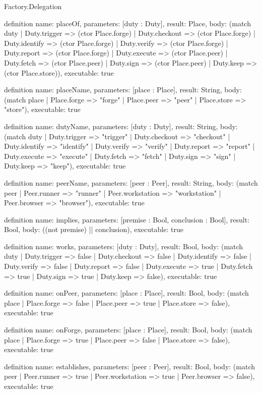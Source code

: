 \begin{lexlean}{Factory.Delegation}
\begin{semanticmodule}
definition{
  name: placeOf,
  parameters: [duty : Duty],
  result: Place,
  body: (match duty
    | Duty.trigger => (ctor Place.forge)
    | Duty.checkout => (ctor Place.forge)
    | Duty.identify => (ctor Place.forge)
    | Duty.verify => (ctor Place.forge)
    | Duty.report => (ctor Place.forge)
    | Duty.execute => (ctor Place.peer)
    | Duty.fetch => (ctor Place.peer)
    | Duty.sign => (ctor Place.peer)
    | Duty.keep => (ctor Place.store)),
  executable: true
}

definition{
  name: placeName,
  parameters: [place : Place],
  result: String,
  body: (match place
    | Place.forge => "forge"
    | Place.peer => "peer"
    | Place.store => "store"),
  executable: true
}

definition{
  name: dutyName,
  parameters: [duty : Duty],
  result: String,
  body: (match duty
    | Duty.trigger => "trigger"
    | Duty.checkout => "checkout"
    | Duty.identify => "identify"
    | Duty.verify => "verify"
    | Duty.report => "report"
    | Duty.execute => "execute"
    | Duty.fetch => "fetch"
    | Duty.sign => "sign"
    | Duty.keep => "keep"),
  executable: true
}

definition{
  name: peerName,
  parameters: [peer : Peer],
  result: String,
  body: (match peer
    | Peer.runner => "runner"
    | Peer.workstation => "workstation"
    | Peer.browser => "browser"),
  executable: true
}

definition{
  name: implies,
  parameters: [premise : Bool, conclusion : Bool],
  result: Bool,
  body: ((not premise) || conclusion),
  executable: true
}

definition{
  name: works,
  parameters: [duty : Duty],
  result: Bool,
  body: (match duty
    | Duty.trigger => false
    | Duty.checkout => false
    | Duty.identify => false
    | Duty.verify => false
    | Duty.report => false
    | Duty.execute => true
    | Duty.fetch => true
    | Duty.sign => true
    | Duty.keep => false),
  executable: true
}

definition{
  name: onPeer,
  parameters: [place : Place],
  result: Bool,
  body: (match place
    | Place.forge => false
    | Place.peer => true
    | Place.store => false),
  executable: true
}

definition{
  name: onForge,
  parameters: [place : Place],
  result: Bool,
  body: (match place
    | Place.forge => true
    | Place.peer => false
    | Place.store => false),
  executable: true
}

definition{
  name: establishes,
  parameters: [peer : Peer],
  result: Bool,
  body: (match peer
    | Peer.runner => true
    | Peer.workstation => true
    | Peer.browser => false),
  executable: true
}


\end{semanticmodule}
\end{lexlean}
